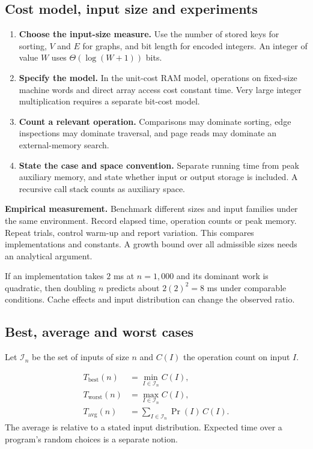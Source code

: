 \documentclass[12pt,a4paper]{article}
\begin{document}
\subsection{Cost model, input size and experiments}
\begin{enumerate}[leftmargin=*, itemsep=3pt, topsep=4pt]
  \item \textbf{Choose the input-size measure.} Use the number of stored keys for sorting, $V$ and $E$ for graphs, and bit length for encoded integers. An integer of value $W$ uses $\Theta(\log(W+1))$ bits.
  \item \textbf{Specify the model.} In the unit-cost RAM model, operations on fixed-size machine words and direct array access cost constant time. Very large integer multiplication requires a separate bit-cost model.
  \item \textbf{Count a relevant operation.} Comparisons may dominate sorting, edge inspections may dominate traversal, and page reads may dominate an external-memory search.
  \item \textbf{State the case and space convention.} Separate running time from peak auxiliary memory, and state whether input or output storage is included. A recursive call stack counts as auxiliary space.
\end{enumerate}
\textbf{Empirical measurement.} Benchmark different sizes and input families under the same environment. Record elapsed time, operation counts or peak memory. Repeat trials, control warm-up and report variation. This compares implementations and constants. A growth bound over all admissible sizes needs an analytical argument.
\begin{tcolorbox}[examplebox, title={Predicting growth from the model}]
If an implementation takes $2$ ms at $n=1{,}000$ and its dominant work is quadratic, then doubling $n$ predicts about $2(2)^2=8$ ms under comparable conditions. Cache effects and input distribution can change the observed ratio.
\end{tcolorbox}

\subsection{Best, average and worst cases}
Let $\mathcal{I}_n$ be the set of inputs of size $n$ and $C(I)$ the operation count on input $I$.
\begin{tcolorbox}[formulabox, title={Case definitions}]
\begin{align*}
T_{\mathrm{best}}(n)&=\min_{I\in\mathcal{I}_n} C(I),\\
T_{\mathrm{worst}}(n)&=\max_{I\in\mathcal{I}_n} C(I),\\
T_{\mathrm{avg}}(n)&=\sum_{I\in\mathcal{I}_n}\Pr(I)\,C(I).
\end{align*}
The average is relative to a stated input distribution. Expected time over a program's random choices is a separate notion.
\end{tcolorbox}
\end{document}
